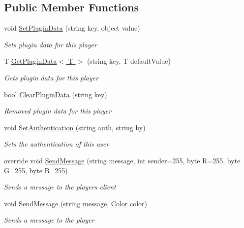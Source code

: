 \subsection*{Public Member Functions}
\begin{DoxyCompactItemize}
\item 
void \hyperlink{class_o_t_a_1_1_base_player_a321156f56970ae2e127a2c19b74d3e4c}{Set\+Plugin\+Data} (string key, object value)
\begin{DoxyCompactList}\small\item\em Sets plugin data for this player \end{DoxyCompactList}\item 
T \hyperlink{class_o_t_a_1_1_base_player_a0049fdf67ce2ce991201cd293bae51b8}{Get\+Plugin\+Data$<$ T $>$} (string key, T default\+Value)
\begin{DoxyCompactList}\small\item\em Gets plugin data for this player \end{DoxyCompactList}\item 
bool \hyperlink{class_o_t_a_1_1_base_player_a66b7faa12f0ac91b28aaeb9390c4fa57}{Clear\+Plugin\+Data} (string key)
\begin{DoxyCompactList}\small\item\em Removed plugin data for this player \end{DoxyCompactList}\item 
void \hyperlink{class_o_t_a_1_1_base_player_a6143de9bea4088f34ef1da07ff84723a}{Set\+Authentication} (string auth, string by)
\begin{DoxyCompactList}\small\item\em Sets the authentication of this user \end{DoxyCompactList}\item 
override void \hyperlink{class_o_t_a_1_1_base_player_a59a949bff7e0cb3588079ae55edf1e74}{Send\+Message} (string message, int sender=255, byte R=255, byte G=255, byte B=255)
\begin{DoxyCompactList}\small\item\em Sends a message to the players client \end{DoxyCompactList}\item 
void \hyperlink{class_o_t_a_1_1_base_player_a2a4626d0161072d730cd6fbfdb01b3ce}{Send\+Message} (string message, \hyperlink{struct_microsoft_1_1_xna_1_1_framework_1_1_color}{Color} color)
\begin{DoxyCompactList}\small\item\em Sends a message to the player \end{DoxyCompactList}\end{DoxyCompactItemize}

